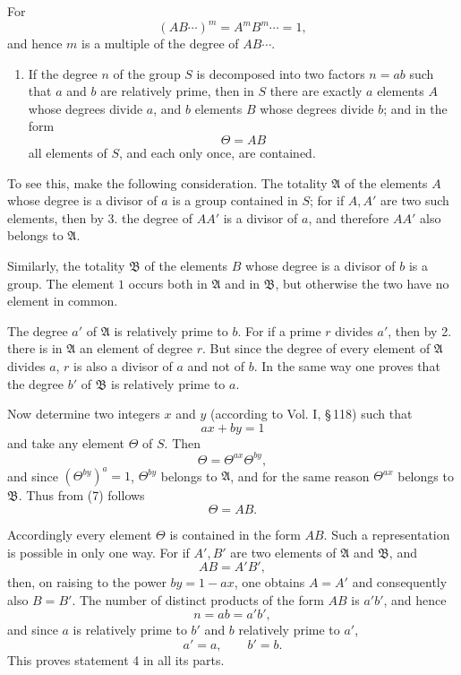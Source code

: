 \documentclass[11pt]{article}
\begin{document}
For
\[
(AB\cdots)^m=A^mB^m\cdots=1,
\]
and hence $m$ is a multiple of the degree of $AB\cdots$.

\begin{enumerate}[resume,label=\arabic*.]
\item If the degree $n$ of the group $S$ is decomposed into two factors $n=ab$ such that $a$ and $b$ are relatively prime, then in $S$ there are exactly $a$ elements $A$ whose degrees divide $a$, and $b$ elements $B$ whose degrees divide $b$; and in the form
\begin{equation}
\Theta=AB
\tag{5}
\end{equation}
all elements of $S$, and each only once, are contained.
\end{enumerate}

To see this, make the following consideration. The totality $\mathfrak A$ of the elements $A$ whose degree is a divisor of $a$ is a group contained in $S$; for if $A,A'$ are two such elements, then by 3. the degree of $AA'$ is a divisor of $a$, and therefore $AA'$ also belongs to $\mathfrak A$.

Similarly, the totality $\mathfrak B$ of the elements $B$ whose degree is a divisor of $b$ is a group. The element $1$ occurs both in $\mathfrak A$ and in $\mathfrak B$, but otherwise the two have no element in common.

The degree $a'$ of $\mathfrak A$ is relatively prime to $b$. For if a prime $r$ divides $a'$, then by 2. there is in $\mathfrak A$ an element of degree $r$. But since the degree of every element of $\mathfrak A$ divides $a$, $r$ is also a divisor of $a$ and not of $b$. In the same way one proves that the degree $b'$ of $\mathfrak B$ is relatively prime to $a$.

Now determine two integers $x$ and $y$ (according to Vol. I, \S\,118) such that
\begin{equation}
ax+by=1
\tag{6}
\end{equation}
and take any element $\Theta$ of $S$. Then
\begin{equation}
\Theta=\Theta^{ax}\Theta^{by},
\tag{7}
\end{equation}
and since $(\Theta^{by})^a=1$, $\Theta^{by}$ belongs to $\mathfrak A$, and for the same reason $\Theta^{ax}$ belongs to $\mathfrak B$. Thus from (7) follows
\begin{equation}
\Theta=AB.
\tag{8}
\end{equation}

Accordingly every element $\Theta$ is contained in the form $AB$. Such a representation is possible in only one way. For if $A',B'$ are two elements of $\mathfrak A$ and $\mathfrak B$, and
\[
AB=A'B',
\]
then, on raising to the power $by=1-ax$, one obtains $A=A'$ and consequently also $B=B'$. The number of distinct products of the form $AB$ is $a'b'$, and hence
\[
n=ab=a'b',
\]
and since $a$ is relatively prime to $b'$ and $b$ relatively prime to $a'$,
\[
a'=a,
\qquad
b'=b.
\]
This proves statement 4 in all its parts.
\end{document}
